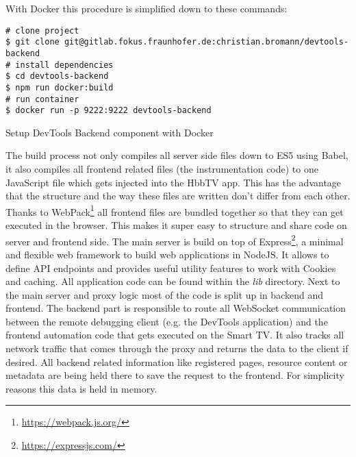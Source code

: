 With Docker this procedure is simplified down to these commands:

\vspace{1cm}
\begin{listing}[H]
\begin{verbatim}
# clone project
$ git clone git@gitlab.fokus.fraunhofer.de:christian.bromann/devtools-backend
# install dependencies
$ cd devtools-backend
$ npm run docker:build
# run container
$ docker run -p 9222:9222 devtools-backend
\end{verbatim}
\caption{Setup DevTools Backend component with Docker}
\label{lst:setupdevtools}
\end{listing}
\vspace{0.5cm}

The build process not only compiles all server side files down to ES5 using Babel, it also compiles
all frontend related files (the instrumentation code) to one JavaScript file which gets injected
into the HbbTV app. This has the advantage that the structure and the way these files are written
don't differ from each other. Thanks to WebPack\footnote{\url{https://webpack.js.org/}} all frontend
files are bundled together so that they can get executed in the browser. This makes it super easy
to structure and share code on server and frontend side. The main server is build on top of Express\footnote{\url{https://expressjs.com/}},
a minimal and flexible web framework to build web applications in NodeJS. It allows to define API
endpoints and provides useful utility features to work with Cookies and caching. All application code
can be found within the \textit{lib} directory. Next to the main server and proxy logic most of the
code is split up in backend and frontend. The backend part is responsible to route all WebSocket
communication between the remote debugging client (e.g. the DevTools application) and the frontend
automation code that gets executed on the Smart TV. It also tracks all network traffic that comes
through the proxy and returns the data to the client if desired. All backend related information
like registered pages, resource content or metadata are being held there to save the request to the
frontend. For simplicity reasons this data is held in memory.

